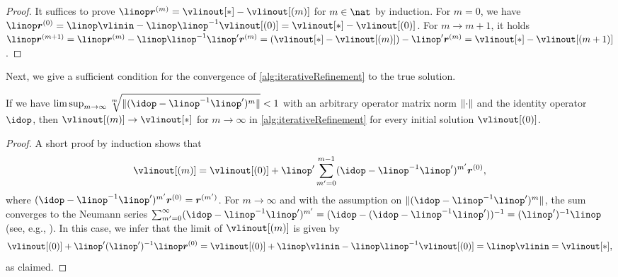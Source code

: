 \vspace{-0.5em}

\begin{proof}
  It suffices to prove $\linop \*r^{(m)} = \vlinout[\ast] - \vlinout[(m)]$
  for $m \in \nat$ by induction.
  For $m = 0$, we have
  $\linop \*r^{(0)}
  = \linop \vlinin - \linop \linop^{-1} \vlinout[(0)]
  = \vlinout[\ast] - \vlinout[(0)]$.
  For $m \to m+1$, it holds
  $\linop \*r^{(m+1)}
  = \linop \*r^{(m)} - \linop \linop^{-1} \linop' \*r^{(m)}
  = (\vlinout[\ast] - \vlinout[(m)]) - \linop' \*r^{(m)}
  = \vlinout[\ast] - \vlinout[(m+1)]$.
\end{proof}

\vspace{0.5em}

\noindent
Next, we give a sufficient condition for the
convergence of \cref{alg:iterativeRefinement} to the true solution.

\vspace{0.5em}

\begin{proposition}
  \label{prop:iterativeRefinementSufficient}
  If we have $\limsup_{m \to \infty}
  \sqrt[m]{\norm{(\idop - \linop^{-1} \linop')^m}} < 1$
  with an arbitrary operator matrix norm $\norm{\cdot}$ and the
  identity operator $\idop$,
  then $\vlinout[(m)] \to \vlinout[\ast]$ for $m \to \infty$
  in \cref{alg:iterativeRefinement}
  for every initial solution $\vlinout[(0)]$.
\end{proposition}

\vspace{-0.5em}

\begin{proof}
  A short proof by induction shows that
  \begin{equation}
    \label{eq:proofPropIterativeRefinementSufficient}
    \vlinout[(m)]
    = \vlinout[(0)] + \linop'
    \sum_{m'=0}^{m-1} (\idop - \linop^{-1} \linop')^{m'} \*r^{(0)},
  \end{equation}
  where $(\idop - \linop^{-1} \linop')^{m'} \*r^{(0)} = \*r^{(m')}$.
  For $m \to \infty$ and with the assumption on
  $\norm{(\idop - \linop^{-1} \linop')^m}$,
  the sum converges to the Neumann series
  $\sum_{m'=0}^\infty (\idop - \linop^{-1} \linop')^{m'}
  = (\idop - (\idop - \linop^{-1} \linop'))^{-1} = (\linop')^{-1} \linop$
  (see, e.g., \cite{Werner11Funktionalanalysis}).
  In this case, we infer that the limit of $\vlinout[(m)]$ is given by
  \begin{equation}
    \vlinout[(0)] + \linop' (\linop')^{-1} \linop \*r^{(0)}
    = \vlinout[(0)] + \linop \vlinin - \linop \linop^{-1} \vlinout[(0)]
    = \linop \vlinin
    = \vlinout[\ast],
  \end{equation}
  as claimed.
\end{proof}

